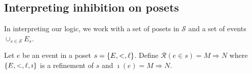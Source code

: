 



\subsection{Interpreting inhibition on posets}

In interpreting our logic, we work with a set of posets in $\mathcal{S}$ and a set of events $\cup_{s\in\mathcal{S}} E_s$.

\begin{definition}
  Let $e$ be an event in a poset $s=\{E,<,\ell\}$.
  Define $\mathcal{R}(e\in s) = M\Rightarrow N$ where $\{E,<,\ell,\imath\}$ is a refinement of $s$ and $\imath(e) = M\Rightarrow N$.
\end{definition}

